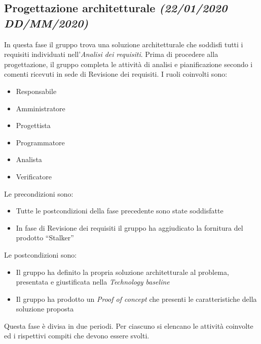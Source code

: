 \documentclass[../piano-di-progetto.tex]{subfiles}
\begin{document}
\subsection[Progettazione architetturale]{Progettazione architetturale {\normalsize\normalfont\itshape(22/01/2020  DD/MM/2020)}}%
\label{sub:progettazione_architetturale}
In questa fase il gruppo trova una soluzione architetturale che soddisfi tutti i requisiti individuati nell'\textit{Analisi dei requisiti}.
Prima di procedere alla progettazione, il gruppo completa le attività di analisi e pianificazione secondo i comenti ricevuti in sede di Revisione dei requisiti.
I ruoli coinvolti sono:
\begin{itemize}
  \item Responsabile
  \item Amministratore
  \item Progettista
  \item Programmatore
  \item Analista
  \item Verificatore
\end{itemize}
Le precondizioni sono:
\begin{itemize}
  \item Tutte le postcondizioni della fase precedente sono state soddisfatte
  \item In fase di Revisione dei requisiti il gruppo ha aggiudicato la fornitura del prodotto ``Stalker''
\end{itemize}
Le postcondizioni sono:
\begin{itemize}
  \item Il gruppo ha definito la propria soluzione architetturale al problema, presentata e giustificata nella \textit{Technology baseline}
  \item Il gruppo ha prodotto un \textit{Proof of concept} che presenti le caratteristiche della soluzione proposta
\end{itemize}
Questa fase è divisa in due periodi.
Per ciascuno si elencano le attività coinvolte ed i rispettivi compiti che devono essere svolti.
\end{document}
